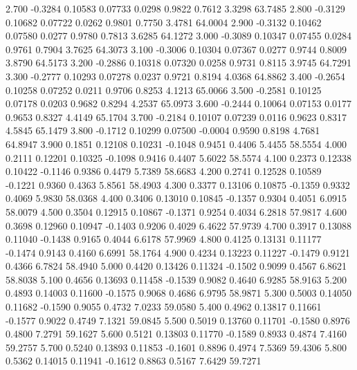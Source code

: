    2.700  -0.3284   0.10583   0.07733   0.0298   0.9822   0.7612   3.3298  63.7485
   2.800  -0.3129   0.10682   0.07722   0.0262   0.9801   0.7750   3.4781  64.0004
   2.900  -0.3132   0.10462   0.07580   0.0277   0.9780   0.7813   3.6285  64.1272
   3.000  -0.3089   0.10347   0.07455   0.0284   0.9761   0.7904   3.7625  64.3073
   3.100  -0.3006   0.10304   0.07367   0.0277   0.9744   0.8009   3.8790  64.5173
   3.200  -0.2886   0.10318   0.07320   0.0258   0.9731   0.8115   3.9745  64.7291
   3.300  -0.2777   0.10293   0.07278   0.0237   0.9721   0.8194   4.0368  64.8862
   3.400  -0.2654   0.10258   0.07252   0.0211   0.9706   0.8253   4.1213  65.0066
   3.500  -0.2581   0.10125   0.07178   0.0203   0.9682   0.8294   4.2537  65.0973
   3.600  -0.2444   0.10064   0.07153   0.0177   0.9653   0.8327   4.4149  65.1704
   3.700  -0.2184   0.10107   0.07239   0.0116   0.9623   0.8317   4.5845  65.1479
   3.800  -0.1712   0.10299   0.07500  -0.0004   0.9590   0.8198   4.7681  64.8947
   3.900   0.1851   0.12108   0.10231  -0.1048   0.9451   0.4406   5.4455  58.5554
   4.000   0.2111   0.12201   0.10325  -0.1098   0.9416   0.4407   5.6022  58.5574
   4.100   0.2373   0.12338   0.10422  -0.1146   0.9386   0.4479   5.7389  58.6683
   4.200   0.2741   0.12528   0.10589  -0.1221   0.9360   0.4363   5.8561  58.4903
   4.300   0.3377   0.13106   0.10875  -0.1359   0.9332   0.4069   5.9830  58.0368
   4.400   0.3406   0.13010   0.10845  -0.1357   0.9304   0.4051   6.0915  58.0079
   4.500   0.3504   0.12915   0.10867  -0.1371   0.9254   0.4034   6.2818  57.9817
   4.600   0.3698   0.12960   0.10947  -0.1403   0.9206   0.4029   6.4622  57.9739
   4.700   0.3917   0.13088   0.11040  -0.1438   0.9165   0.4044   6.6178  57.9969
   4.800   0.4125   0.13131   0.11177  -0.1474   0.9143   0.4160   6.6991  58.1764
   4.900   0.4234   0.13223   0.11227  -0.1479   0.9121   0.4366   6.7824  58.4940
   5.000   0.4420   0.13426   0.11324  -0.1502   0.9099   0.4567   6.8621  58.8038
   5.100   0.4656   0.13693   0.11458  -0.1539   0.9082   0.4640   6.9285  58.9163
   5.200   0.4893   0.14003   0.11600  -0.1575   0.9068   0.4686   6.9795  58.9871
   5.300   0.5003   0.14050   0.11682  -0.1590   0.9055   0.4732   7.0233  59.0580
   5.400   0.4962   0.13817   0.11661  -0.1577   0.9022   0.4749   7.1321  59.0845
   5.500   0.5019   0.13760   0.11701  -0.1580   0.8976   0.4800   7.2791  59.1627
   5.600   0.5121   0.13803   0.11770  -0.1589   0.8933   0.4874   7.4160  59.2757
   5.700   0.5240   0.13893   0.11853  -0.1601   0.8896   0.4974   7.5369  59.4306
   5.800   0.5362   0.14015   0.11941  -0.1612   0.8863   0.5167   7.6429  59.7271
